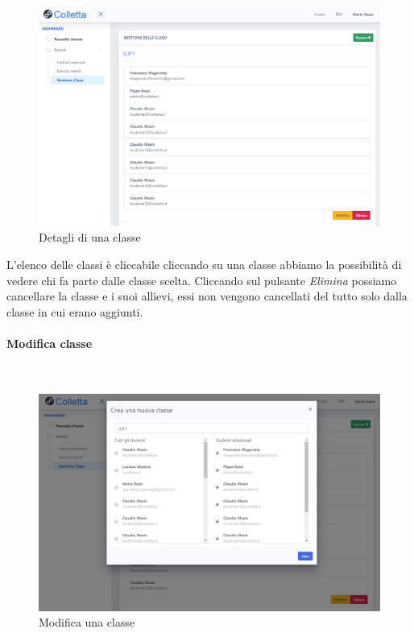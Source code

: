 \begin{figure}[H]
            	\centering
        		\includegraphics[width=17cm]{sez/img/insegnante/gestioneclasse.PNG} 
            	\caption{Detagli di una classe}\label{fig:1}
        	\end{figure}
        	
        	
 L'elenco delle classi è cliccabile cliccando su una classe abbiamo la possibilità di vedere chi fa parte dalle classe scelta. Cliccando sul pulsante \textit{Elimina} possiamo cancellare la classe e i suoi allievi, essi non vengono cancellati del tutto solo dalla classe in cui erano aggiunti.         
       
       \newpage
         \paragraph{Modifica classe}\mbox{}\\	      
        
         \begin{figure}[H]
            	\centering
        		\includegraphics[width=17cm]{sez/img/insegnante/modificaclasse.PNG} 
            	\caption{Modifica una classe}\label{fig:1}
        	\end{figure}
        	
